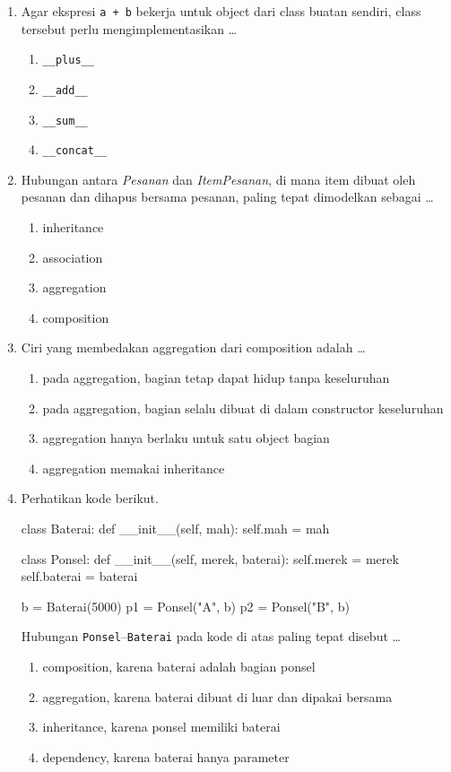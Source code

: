 \begin{enumerate}
  \item Agar ekspresi \texttt{a + b} bekerja untuk object dari class buatan sendiri, class tersebut perlu mengimplementasikan \ldots
  \begin{enumerate}[label=\alph*.,itemsep=0pt]
    \item \texttt{\_\_plus\_\_}
    \item \texttt{\_\_add\_\_}
    \item \texttt{\_\_sum\_\_}
    \item \texttt{\_\_concat\_\_}
  \end{enumerate}

  \item Hubungan antara \emph{Pesanan} dan \emph{ItemPesanan}, di mana item dibuat oleh pesanan dan dihapus bersama pesanan, paling tepat dimodelkan sebagai \ldots
  \begin{enumerate}[label=\alph*.,itemsep=0pt]
    \item inheritance
    \item association
    \item aggregation
    \item composition
  \end{enumerate}

  \item Ciri yang membedakan aggregation dari composition adalah \ldots
  \begin{enumerate}[label=\alph*.,itemsep=0pt]
    \item pada aggregation, bagian tetap dapat hidup tanpa keseluruhan
    \item pada aggregation, bagian selalu dibuat di dalam constructor keseluruhan
    \item aggregation hanya berlaku untuk satu object bagian
    \item aggregation memakai inheritance
  \end{enumerate}

  \item Perhatikan kode berikut.
\begin{kode}[Soal 7]
class Baterai:
    def __init__(self, mah):
        self.mah = mah

class Ponsel:
    def __init__(self, merek, baterai):
        self.merek = merek
        self.baterai = baterai

b = Baterai(5000)
p1 = Ponsel("A", b)
p2 = Ponsel("B", b)
\end{kode}
  Hubungan \texttt{Ponsel}--\texttt{Baterai} pada kode di atas paling tepat disebut \ldots
  \begin{enumerate}[label=\alph*.,itemsep=0pt]
    \item composition, karena baterai adalah bagian ponsel
    \item aggregation, karena baterai dibuat di luar dan dipakai bersama
    \item inheritance, karena ponsel memiliki baterai
    \item dependency, karena baterai hanya parameter
  \end{enumerate}


\end{enumerate}
